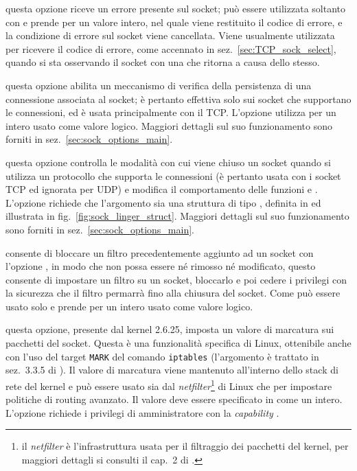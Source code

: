 \begin{basedescript}{\desclabelwidth{2.2cm}\desclabelstyle{\nextlinelabel}}
\item[\constd{SO\_ERROR}] questa opzione riceve un errore presente sul socket;
  può essere utilizzata soltanto con  e prende per
   un valore intero, nel quale viene restituito il codice di
  errore, e la condizione di errore sul socket viene cancellata. Viene
  usualmente utilizzata per ricevere il codice di errore, come accennato in
  sez.~\ref{sec:TCP_sock_select}, quando si sta osservando il socket con una
   che ritorna a causa dello stesso.

\item[\const{SO\_KEEPALIVE}] questa opzione abilita un meccanismo di verifica
  della persistenza di una connessione associata al socket; è pertanto
  effettiva solo sui socket che supportano le connessioni, ed è usata
  principalmente con il TCP. L'opzione utilizza per  un intero
  usato come valore logico. Maggiori dettagli sul suo funzionamento sono
  forniti in sez.~\ref{sec:sock_options_main}.

\item[\const{SO\_LINGER}] questa opzione controlla le modalità con cui viene
  chiuso un socket quando si utilizza un protocollo che supporta le
  connessioni (è pertanto usata con i socket TCP ed ignorata per UDP) e
  modifica il comportamento delle funzioni  e .
  L'opzione richiede che l'argomento  sia una struttura di tipo
  , definita in  ed illustrata in
  fig.~\ref{fig:sock_linger_struct}.  Maggiori dettagli sul suo funzionamento
  sono forniti in sez.~\ref{sec:sock_options_main}.

\item[\constd{SO\_LOCK\_FILTER}] consente di bloccare un filtro
  precedentemente aggiunto ad un socket con l'opzione
  , in modo che non possa essere né rimosso né
  modificato, questo consente di impostare un filtro su un socket, bloccarlo e
  poi cedere i privilegi con la sicurezza che il filtro permarrà fino alla
  chiusura del socket. Come  può essere usato solo
   e prende per  un intero usato come valore
  logico.

\item[\constd{SO\_MARK}] questa opzione, presente dal kernel 2.6.25, imposta
  un valore di marcatura sui pacchetti del socket. Questa è una funzionalità
  specifica di Linux, ottenibile anche con l'uso del target \texttt{MARK}
  del comando \texttt{iptables} (l'argomento è trattato in sez.~3.3.5 di
  \cite{SGL}). Il valore di marcatura viene mantenuto all'interno dello stack
  di rete del kernel e può essere usato sia dal 
  \textit{netfilter}\footnote{il \textit{netfilter} è l'infrastruttura usata
    per il filtraggio dei pacchetti del kernel, per maggiori dettagli si
    consulti il cap.~2 di \cite{FwGL}.} di Linux che per impostare politiche
  di routing avanzato. Il valore deve essere specificato in 
  come un intero. L'opzione richiede i privilegi di amministratore con la
  \textit{capability} .


\end{basedescript}
